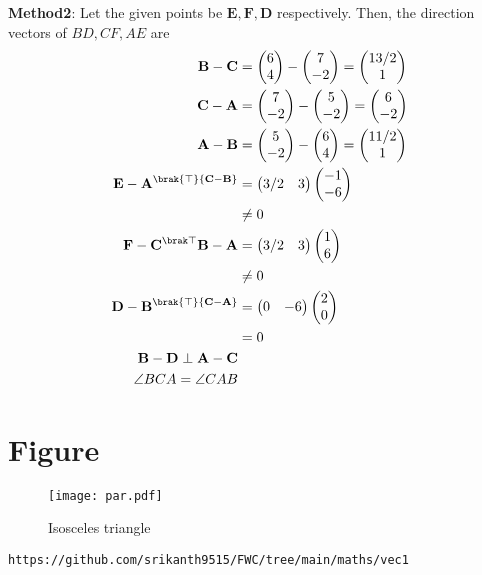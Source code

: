 \documentclass{article}
\newcommand{\myvec}[1]{\ensuremath{\begin{pmatrix}#1\end{pmatrix}}}
\let\vec\mathbf
\begin{document}
\textbf{Method2}: Let the given points be $\vec{E}, \vec{F}, \vec{D}$ respectively. 
 Then, the direction vectors of  $BD ,CF,AE$ are
\begin{align}
\vec{B}-\vec{C}&= \myvec{6 \\ 4}-\myvec{7 \\-2} = \myvec{13/2 \\ 1}\\
\vec{C}-\vec{A}&= \myvec{7 \\-2}-\myvec{5 \\-2} = \myvec{6 \\ -2}\\
\vec{A}-\vec{B}&= \myvec{5 \\ -2} -\myvec{6 \\4} = \myvec{11/2 \\ 1}\\
{\vec{E}-\vec{A}}^\brak{\top}{\vec{C}-\vec{B}}&= \myvec{3/2 & 3}\myvec{-1 \\ -6}\\
&\neq0\\
{\vec{F}-\vec{C}}^{\brak\top}{\vec{B}-\vec{A}}&= \myvec{3/2 & 3}\myvec{1 \\ 6}\\
&\neq 0\\
{\vec{D}-\vec{B}}^\brak{\top}{\vec{C}-\vec{A}}&= \myvec{0 & -6}\myvec{2 \\ 0}\\
&=0 \\
{\vec{B} -\vec{D}}\perp {\vec{A} -\vec{C}}\\
\angle BCA = \angle CAB  
\end{align}

\pagebreak\section{Figure}
\begin{figure}[h]
\texttt{[image: par.pdf]}
\caption{Isosceles triangle}
		\label{fig:Figure}
\end{figure}
\begin{lstlisting}
https://github.com/srikanth9515/FWC/tree/main/maths/vec1
\end{lstlisting}
\end{document}
